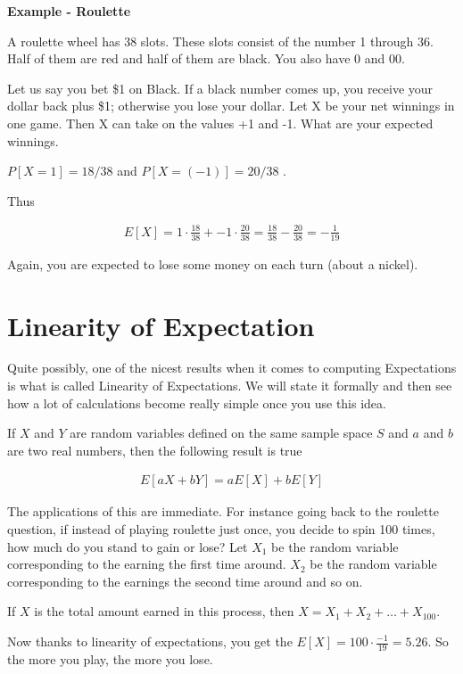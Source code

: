 \documentclass[12pt]{article}
\begin{document}
\textbf{Example - Roulette}

A roulette wheel has 38 slots. These slots consist of the number 1 through 36. Half of them are red and half of them are black. You also have 0 and 00.  

Let us say you bet \$1 on Black. If a black number comes up, you receive
your dollar back plus \$1; otherwise you lose your dollar. Let X be your net winnings in one game. Then X can take on the values +1 and -1. What are your expected winnings.

$P[X = 1] = 18/38$ and  $P[X = (-1)] = 20/38$ . 

Thus

\begin{align*}
E[X] = 1 \cdot \frac{18}{38} + -1 \cdot \frac{20}{38} = \frac{18}{38} - \frac{20}{38} = -\frac{1}{19}
\end{align*}

Again, you are expected to lose some money on each turn (about a nickel).

\section*{Linearity of Expectation}
Quite possibly, one of the nicest results when it comes to computing Expectations is what is called Linearity of Expectations. We will state it formally and then see how a lot of calculations become really simple once you use this idea.

If $X$ and $Y$ are random variables defined on the same sample space $S$ and $a$ and $b$ are two real numbers, then the following result is true

\begin{align*}
E[aX + bY] = a E[X] + bE[Y]
\end{align*}

The applications of this are immediate. For instance going back to the roulette question, if instead of playing roulette just once, you decide to spin 100 times, how much do you stand to gain or lose?
Let $X_1$ be the random variable corresponding to the earning the first time around. $X_2$ be the random variable corresponding to the earnings the second time around and so on. 

If $X$ is the total amount earned in this process, then $X = X_1 + X_2 + \ldots + X_{100}$. 

Now thanks to linearity of expectations, you get the $E[X] = 100 \cdot \frac{-1}{19} = 5.26$. So the more you play, the more you lose. 
\end{document}
